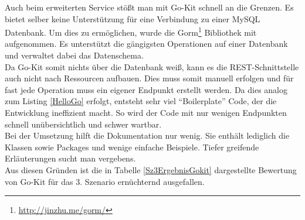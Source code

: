Auch beim erweiterten Service stößt man mit Go-Kit schnell an die Grenzen. Es bietet selber keine Unterstützung für eine Verbindung zu einer MySQL Datenbank. Um dies zu ermöglichen, wurde die Gorm\footnote{\url{http://jinzhu.me/gorm/}} Bibliothek mit aufgenommen. Es unterstützt die gängigsten Operationen auf einer Datenbank und verwaltet dabei das Datenschema.\\
Da Go-Kit somit nichts über die Datenbank weiß, kann es die \ac{REST}-Schnittstelle auch nicht nach Ressourcen aufbauen. Dies muss somit manuell erfolgen und für fast jede Operation muss ein eigener Endpunkt erstellt werden. Da dies analog zum Listing \ref{HelloGo} erfolgt, entsteht sehr viel \enquote{Boilerplate} Code, der die Entwicklung ineffizient macht. So wird der Code mit nur wenigen Endpunkten schnell unübersichtlich und schwer wartbar.\\
Bei der Umsetzung hilft die Dokumentation nur wenig. Sie enthält lediglich die Klassen sowie Packages und wenige einfache Beispiele. Tiefer greifende Erläuterungen sucht man vergebens.\\
Aus diesen Gründen ist die in Tabelle \ref{Sz3ErgebnisGokit} dargestellte Bewertung von Go-Kit für das 3. Szenario ernüchternd ausgefallen.

